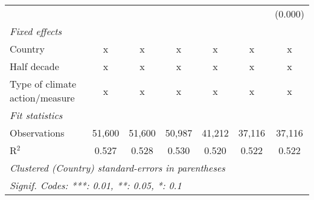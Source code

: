 \begin{tabular}{lcccccc}
                                                     &         &               &              &                &                & (0.000)\\   
   \emph{Fixed effects}\\
   Country                                           & x       & x             & x            & x              & x              & x\\  
   Half decade                                       & x       & x             & x            & x              & x              & x\\  
   Type of climate action/measure                    & x       & x             & x            & x              & x              & x\\  
   \midrule \emph{Fit statistics}\\
   Observations                                      & 51,600  & 51,600        & 50,987       & 41,212         & 37,116         & 37,116\\  
   R$^2$                                             & 0.527   & 0.528         & 0.530        & 0.520          & 0.522          & 0.522\\  
   \midrule
   \multicolumn{7}{l}{\emph{Clustered (Country) standard-errors in parentheses}}\\
   \multicolumn{7}{l}{\emph{Signif. Codes: ***: 0.01, **: 0.05, *: 0.1}}\\
\end{tabular}
\par\endgroup


